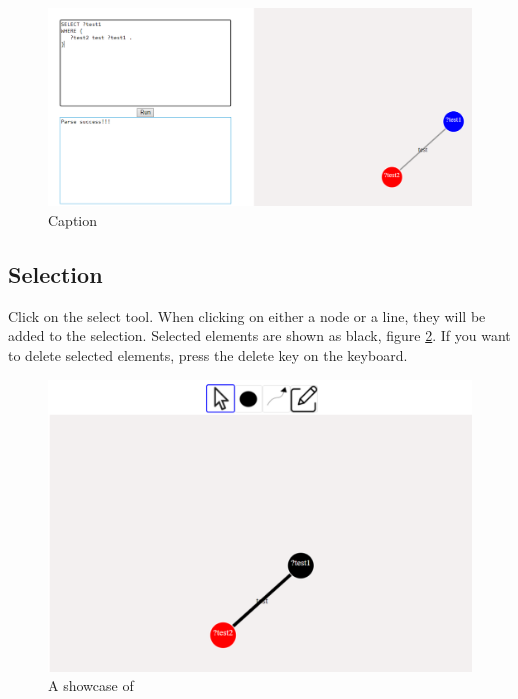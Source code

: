 \begin{figure}[H]
    \centering
    \includegraphics[width=1\textwidth]{figures/visual-query-succ.pdf}
    \caption{Caption}
    \label{fig:visual-success}
\end{figure}

\subsection{Selection}
Click on the select tool. When clicking on either a node or a line, they will be added to the selection. Selected elements are shown as black, figure \ref{fig:user-select}. If you want to delete selected elements, press the delete key on the keyboard.
\begin{figure}[H]
    \centering
    \includegraphics{figures/user-select.pdf}
    \caption{A showcase of }
    \label{fig:user-select}
\end{figure}
